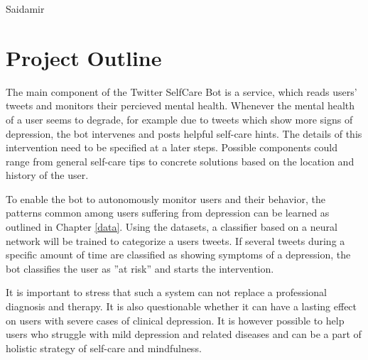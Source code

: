 \documentclass[colorback,accentcolor=tud9c]{tudreport}
\begin{document}
Saidamir

\section*{Project Outline}


The main component of the Twitter SelfCare Bot is a service, which reads users' tweets and monitors their percieved mental health. Whenever the mental health of a user seems to degrade, for example due to tweets which show more signs of depression, the bot intervenes and posts helpful self-care hints. The details of this intervention need to be specified at a later steps. Possible components could range from general self-care tips to concrete solutions based on the location and history of the user.

To enable the bot to autonomously monitor users and their behavior, the patterns common among users suffering from depression can be learned as outlined in Chapter \ref{data}. Using the datasets, a classifier based on a neural network will be trained to categorize a users tweets. If several tweets during a specific amount of time are classified as showing symptoms of a depression, the bot classifies the user as ''at risk'' and starts the intervention.

It is important to stress that such a system can not replace a professional diagnosis and therapy. It is also questionable whether it can have a lasting effect on users with severe cases of clinical depression. It is however possible to help users who struggle with mild depression and related diseases and can be a part of holistic strategy of self-care and mindfulness.
\end{document}
